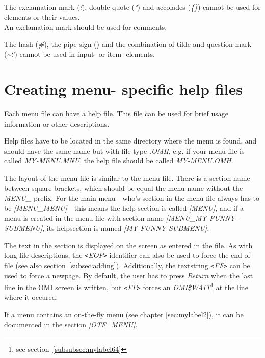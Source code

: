 \documentclass[a4paper]{book}
\newcommand{\vs}{\vspace{3mm}}
\newcommand{\lt}{\texttt{<}}
\newcommand{\gt}{\texttt{>}}
\begin{document}
\vs

The exclamation mark (\textsl{!}), double quote (\textsl{"}) and accolades (\textsl{{\{}{\}}}) cannot 
be used for elements or their values. \\
An exclamation mark should be used for comments.

\vs

The hash (\textsl{{\#}}), the pipe-sign (\textsl{\textbar}) and the combination of tilde and 
question mark (\textsl{\~{}?}) cannot be used in input- or item- elements.

\section{Creating menu- specific help files}\label{sec:mnhelp}

Each menu file can have a help file. This file can be used for brief usage information
or other descriptions.

Help files have to be located in the same directory where the menu is found, and should
have the same name but with file type \textsl{.OMH}, e.g. if your menu file is
called \textsl{MY-MENU.MNU}, the help file should be called \textsl{MY-MENU.OMH}.

\vs

The layout of the menu file is similar to the menu file. There is a section name
between square brackets, which should be equal the menu name without the \textsl{MENU\_} prefix.
For the main menu---who's section in the menu file always has to be \textsl{[MENU\_MENU]}---this
means the help section is called \textsl{[MENU]}, and if a menu is created in the menu file
with section name \textsl{[MENU\_MY-FUNNY-SUBMENU]}, its helpsection is named \textsl{[MY-FUNNY-SUBMENU]}.

\vs

The text in the section is displayed on the screen as entered in the file.
As with long file descriptions, the \textsl{\lt EOF\gt} identifier
can also be used to force the end of file (see also section~\ref{subsec:adding}).
Additionally, the textstring \textsl{\lt FF\gt} can be used to force
a newpage. By default, the user has to press \textsl{Return} when the last line
in the OMI screen is written, but \textsl{\lt FF\gt} forces an \textsl{OMI{\$}WAIT}\footnote{ see section~\ref{subsubsec:mylabel64}}
at the line where it occured.

\vs

If a menu contains an on-the-fly menu (see chapter \ref{sec:mylabel2}), it can be documented in the section \textsl{[OTF{\_}MENU]}.
\end{document}

